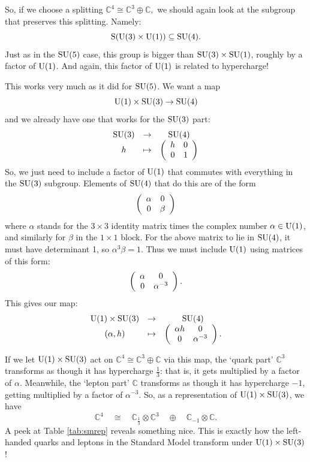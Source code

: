 \documentclass[12pt]{article}
\newcommand{\C}{{\mathbb C}}  %
\newcommand{\U}{{\rm U}}    %
\renewcommand{\S}{{\rm S}}    %
\newcommand{\SU}{{\rm SU}}    %
\newcommand{\iso}{\cong} %
\newcommand{\third}{\frac{1}{3}} %
\begin{document}
So, if we choose a splitting $\C^4 \iso \C^3 \oplus \C,$ 
we should again look at the subgroup that preserves this splitting. 
Namely:
\[ \S(\U(3) \times \U(1)) \subseteq \SU(4) .\]
Just as in the $\SU(5)$ case, this group is bigger than $\SU(3) \times
\SU(1)$, roughly by a factor of $\U(1)$.  And again, this factor of $\U(1)$ 
is related to hypercharge!

This works very much as it did for $\SU(5)$.  We want a map
\[ \U(1) \times \SU(3) \to \SU(4) \]
and we already have one that works for the $\SU(3)$ part:
\[
\begin{array}{ccc}
 \SU(3) &\to & \SU(4) \\
 h &\mapsto & 
\left(
\begin{array}{cc}
	h & 0 \\
	0 & 1
\end{array}
\right)
\end{array}
\]
So, we just need to include a factor of $\U(1)$ that commutes
with everything in the $\SU(3)$ subgroup. 
Elements of $\SU(4)$ that do this are of the form
\[
\left( 
\begin{array}{c c}
\alpha & 0 \\
0 & \beta
\end{array}
\right)
\]
where $\alpha$ stands for
the $3 \times 3$ identity matrix times
the complex number $\alpha \in \U(1)$, and similarly for $\beta$ in the
$1 \times 1$ block.  For the above matrix to lie in $\SU(4)$, it
must have determinant 1, so $\alpha^3 \beta = 1$.  Thus we
must include $\U(1)$ using matrices of this form:
\[
\left( 
\begin{array}{c c}
\alpha & 0 \\
0 & \alpha^{-3}
\end{array}
\right).
\]
This gives our map:
\[
\begin{array}{ccc}
 \U(1) \times \SU(3) &\to& \SU(4)  \\
( \alpha, h) &\mapsto &
\left( 
\begin{array}{c c}
\alpha h & 0 \\
0 & \alpha^{-3}
\end{array}
\right) .
\end{array}
\]

If we let $\U(1) \times \SU(3)$
act on $\C^4 \iso \C^3 \oplus \C$ via this map, the `quark part' 
$\C^3$ transforms as though it has
hypercharge $\third$: that is, it gets multiplied by a factor of $\alpha$.
Meanwhile, the `lepton part' $\C$ transforms as though it has 
hypercharge $-1$, getting multiplied by a factor of $\alpha^{-3}$.  
So, as a representation of $\U(1) \times \SU(3)$, we have
\[ \C^4 \quad \iso \quad
\C_{\third} \otimes \C^3 \quad \oplus \quad \C_{-1} \otimes \C .\]
A peek at Table \ref{tab:smrep} reveals something nice.
This is exactly how the left-handed quarks and leptons 
in the Standard Model transform under $\U(1) \times \SU(3)$!  
\end{document}
